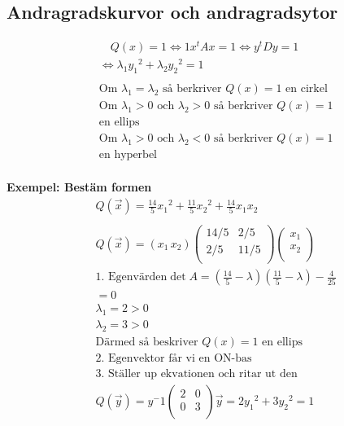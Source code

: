 \begin{multicols}{2}
\section{Andragradskurvor och andragradsytor}
\begin{align*}
  &\quad  Q(x)=1
  \Leftrightarrow 1 x^t A x = 1
  \Leftrightarrow y^t D y = 1 \\
  &\Leftrightarrow \lambda_1 {y_1}^2 + \lambda_2 {y_2}^2 = 1 \\
  &\\
  &\text{Om $\lambda_1 = \lambda_2$ så berkriver $Q(x)=1$ en cirkel} \\
  &\text{Om $\lambda_1 > 0$ och $\lambda_2 > 0$ så berkriver $Q(x)=1$} \\
  &\text{en ellips} \\
  &\text{Om $\lambda_1 > 0$ och $\lambda_2 < 0$ så berkriver $Q(x)=1$} \\
  &\text{en hyperbel} \\
\end{align*}

\textbf{Exempel: Bestäm formen}
\begin{align*}
  &Q(\vec{x})= \frac{14}{5}{x_1}^2 +  \frac{11}{5}{x_2}^2 + \frac{14}{5}x_1x_2  \\
  &\\
  &Q(\vec{x}) = (x_1 \, x_2 )
  \left(\begin{array}{cc}
    14/5 &  2/5  \\
     2/5 & 11/5  \\
  \end{array}\right) \begin{pmatrix} x_1 \\ x_2 \\ \end{pmatrix} \\
  &\text{1. Egenvärden} \det{A} = (\frac{14}{5} -\lambda) (\frac{11}{5} -\lambda) -\frac{4}{25} \\
  &= 0 \\
  &\lambda_1 = 2 > 0 \\
  &\lambda_2 = 3 > 0 \\
  &\text{Därmed så beskriver $Q(x)=1$ en ellips} \\
  &\text{2. Egenvektor får vi en ON-bas} \\
  &\text{3. Ställer up ekvationen och ritar ut den} \\
  &Q (\vec{y}) = y^-1
  \left(\begin{array}{cc}
    2 & 0  \\
    0 & 3  \\
  \end{array}\right) \vec{y} = 2{y_1}^2 + 3{y_2}^2 = 1
\end{align*}



\end{multicols}
